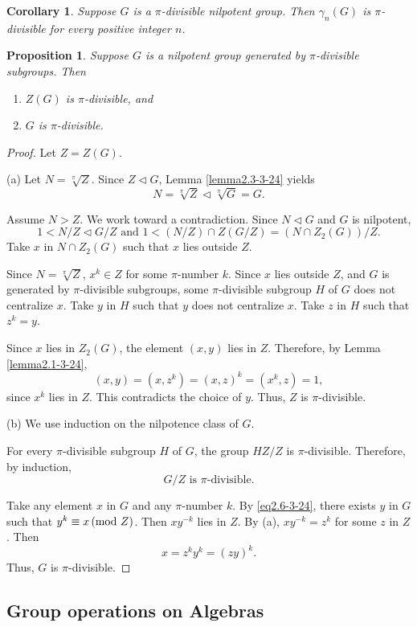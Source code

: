 \documentclass[mathscr]{amsart}
\theoremstyle{theorem}
\newtheorem{proposition}[theorem]{Proposition}
\newtheorem{corollary}[theorem]{Corollary}
\theoremstyle{definition}
\numberwithin{equation}{section}
\newcommand{\smod}[1]{\hspace*{-.1cm}\pmod{#1}}
\def \({\left(}
\def \){\right)}
\begin{document}
\begin{corollary}\label{cor2.5-3-24}
Suppose $G$ is a $\pi$-divisible nilpotent group.  Then
$\gamma_n\(G\)$ is \newline$\pi$-divisible for every positive
integer $n$.
\end{corollary}

\begin{proposition}\label{prop2.6-3.24}
Suppose $G$ is a nilpotent group generated by $\pi$-divisible
subgroups.  Then
\begin{enumerate}
\item[(a)] $Z(G)$ is $\pi$-divisible, and
\item[(b)] $G$ is $\pi$-divisible.
\end{enumerate}
\end{proposition}

\begin{proof}

Let $Z=Z(G)$.

\noindent(a) Let $N=\sqrt[\pi]{Z}$.  Since $Z\lhd G$, Lemma
\ref{lemma2.3-3-24} yields
$$
N=\sqrt[\pi]{Z}\lhd \sqrt[\pi]{G}=G.
$$

Assume $N>Z$.  We work toward a contradiction.  Since $N\lhd G$ and
$G$ is nilpotent,
$$
1<N/Z\lhd G/Z\text{ and }1<\(N/Z\)\cap Z\(G/Z\)=\(N\cap Z_2(G)\)/Z.
$$
Take $x$ in $N\cap Z_2(G)$ such that $x$ lies outside $Z$.

Since $N=\sqrt[\pi]{Z}$, $x^k\in Z$ for some $\pi$-number $k$. Since
$x$ lies outside $Z$, and $G$ is generated by $\pi$-divisible
subgroups, some $\pi$-divisible subgroup $H$ of $G$ does not
centralize $x$. Take $y$ in $H$ such that $y$ does not centralize
$x$. Take $z$ in $H$ such that $z^k=y$.

Since $x$ lies in $Z_2(G)$, the element $(x,y)$ lies in $Z$.
Therefore, by Lemma \ref{lemma2.1-3-24},
$$
(x,y)=\(x,z^k\)=(x,z)^{k}=\(x^k,z\)=1,
$$
since $x^k$ lies in $Z$.  This contradicts the choice of $y$.  Thus,
$Z$ is $\pi$-divisible.

\noindent(b)  We use induction on the nilpotence class of $G$.

For every $\pi$-divisible subgroup $H$ of $G$, the group $HZ/Z$ is
$\pi$-divisible.  Therefore, by induction,
\begin{equation}\label{eq2.6-3-24}
G/Z\text{ is }\pi\text{-divisible}.
\end{equation}

Take any element $x$ in $G$ and any $\pi$-number $k$.  By
\eqref{eq2.6-3-24}, there exists $y$ in $G$ such that $y^k\equiv
x\smod Z$.  Then $xy^{-k}$ lies in $Z$.  By (a), $xy^{-k}=z^k$ for
some $z$ in $Z$.  Then
$$
x=z^ky^k=\(zy\)^k.
$$
Thus, $G$ is $\pi$-divisible.


\end{proof}
\begin{center}
\section{Group operations on Algebras}
\label{sec3}
\end{center}
\end{document}

